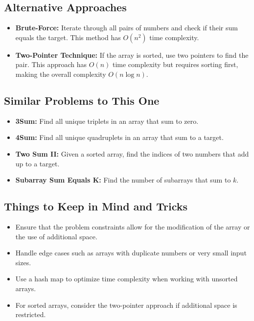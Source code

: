 \subsection*{Alternative Approaches}
\begin{itemize}
    \item \textbf{Brute-Force:} Iterate through all pairs of numbers and check if their sum equals the target. This method has \( O(n^2) \) time complexity.
    \item \textbf{Two-Pointer Technique:} If the array is sorted, use two pointers to find the pair. This approach has \( O(n) \) time complexity but requires sorting first, making the overall complexity \( O(n \log n) \).
\end{itemize}

\subsection*{Similar Problems to This One}
\begin{itemize}
    \item \textbf{3Sum:} Find all unique triplets in an array that sum to zero.
    \item \textbf{4Sum:} Find all unique quadruplets in an array that sum to a target.
    \item \textbf{Two Sum II:} Given a sorted array, find the indices of two numbers that add up to a target.
    \item \textbf{Subarray Sum Equals K:} Find the number of subarrays that sum to \( k \).
\end{itemize}

\subsection*{Things to Keep in Mind and Tricks}
\begin{itemize}
    \item Ensure that the problem constraints allow for the modification of the array or the use of additional space.
    \item Handle edge cases such as arrays with duplicate numbers or very small input sizes.
    \item Use a hash map to optimize time complexity when working with unsorted arrays.
    \item For sorted arrays, consider the two-pointer approach if additional space is restricted.
\end{itemize}

